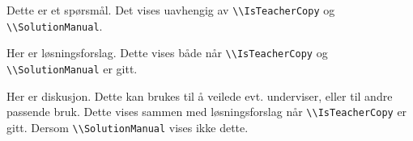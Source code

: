 \bpa
  \bppa
    Dette er et spørsmål. Det vises uavhengig av \lstinline{\\IsTeacherCopy} og \lstinline{\\SolutionManual}.
    \begin{solution}
      Her er løsningsforslag. Dette vises både når \lstinline{\\IsTeacherCopy} og \lstinline{\\SolutionManual} er gitt.
    \end{solution}
    \begin{direction}
      Her er diskusjon. Dette kan brukes til å veilede evt. underviser, eller til andre passende bruk. Dette vises sammen med løsningsforslag når \lstinline{\\IsTeacherCopy} er gitt. Dersom \lstinline{\\SolutionManual} vises ikke dette.
    \end{direction}
  \epp
\epa
